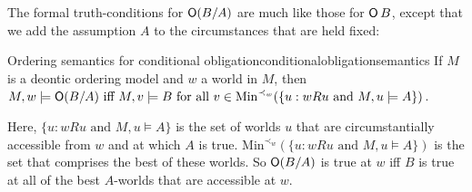 



The formal truth-conditions for $\operatorname{\mathsf{O}}(B/A)$ are much like those for $\operatorname{\mathsf{O}} B$, except
that we add the assumption $A$ to the circumstances that are held fixed:

\begin{definition}{Ordering semantics for conditional obligation}{conditionalobligationsemantics}
  If $M$ is a deontic ordering model and $w$ a world in $M$, then\\[1mm]
$M,w \models \Ob (B/A) \text{ iff $M,v \models B$ for all
  $v \in \mathrm{Min}^{\prec_w}(\{ u: wRu \text{ and } M,u\models A \})$}$.
\end{definition}
%
\noindent%
Here, $\{ u: wRu \text{ and } M,u\models A \}$ is the set of worlds $u$ that are
circumstantially accessible from $w$ and at which $A$ is true.
$\mathrm{Min}^{\prec_{w}}(\{ u: wRu \text{ and } M,u\models A \})$ is the set that
comprises the best of these worlds. So $\operatorname{\mathsf{O}}(B/A)$ is true at $w$ iff $B$ is true
at all of the best $A$-worlds that are accessible at $w$.





